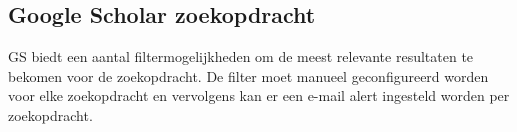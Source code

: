 
\chapter{}%
\label{ch:methodologie}

\section{Google Scholar zoekopdracht}
GS biedt een aantal filtermogelijkheden om de meest relevante resultaten te bekomen voor de zoekopdracht. De filter moet manueel geconfigureerd worden voor elke zoekopdracht en vervolgens kan er een e-mail alert ingesteld worden per zoekopdracht.
